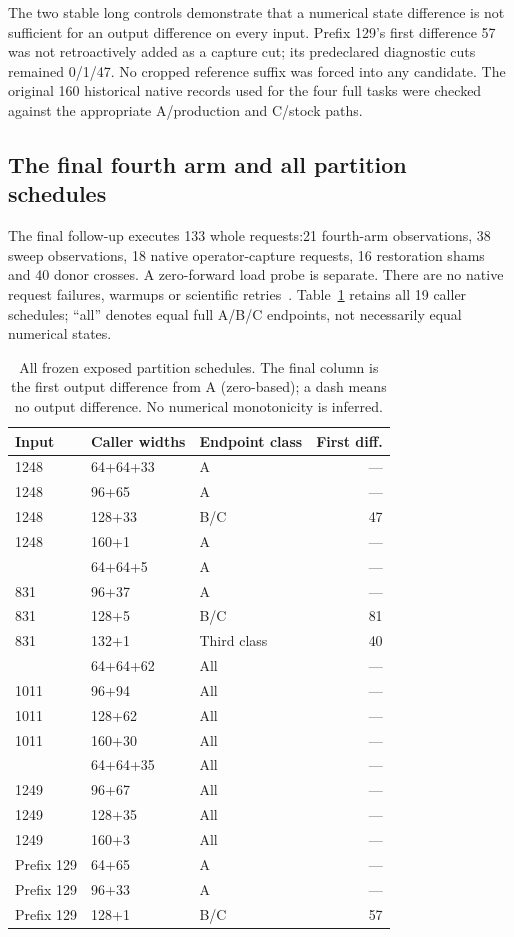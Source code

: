 The two stable long controls demonstrate that a numerical state difference is not sufficient for an output difference on every input. Prefix 129's first difference 57 was not retroactively added as a capture cut; its predeclared diagnostic cuts remained 0/1/47. No cropped reference suffix was forced into any candidate. The original 160 historical native records used for the four full tasks were checked against the appropriate A/production and C/stock paths.

\subsection{The final fourth arm and all partition schedules}
The final follow-up executes 133 whole requests:21 fourth-arm observations, 38 sweep observations, 18 native operator-capture requests, 16 restoration shams and 40 donor crosses. A zero-forward load probe is separate. There are no native request failures, warmups or scientific retries~\cite{bfinal}. Table~\ref{tab:allpart} retains all 19 caller schedules; ``all'' denotes equal full A/B/C endpoints, not necessarily equal numerical states.

\begin{table}[t]\centering\small
\caption{All frozen exposed partition schedules. The final column is the first output difference from A (zero-based); a dash means no output difference. No numerical monotonicity is inferred.}
\label{tab:allpart}
\begin{tabular}{@{}lllr@{}}\toprule
Input&Caller widths&Endpoint class&First diff.\\\midrule
1248&64+64+33&A&---\\
1248&96+65&A&---\\
1248&128+33&B/C&47\\
1248&160+1&A&---\\\addlinespace[2pt]
831&64+64+5&A&---\\
831&96+37&A&---\\
831&128+5&B/C&81\\
831&132+1&Third class&40\\\addlinespace[2pt]
1011&64+64+62&All&---\\
1011&96+94&All&---\\
1011&128+62&All&---\\
1011&160+30&All&---\\\addlinespace[2pt]
1249&64+64+35&All&---\\
1249&96+67&All&---\\
1249&128+35&All&---\\
1249&160+3&All&---\\\addlinespace[2pt]
Prefix 129&64+65&A&---\\
Prefix 129&96+33&A&---\\
Prefix 129&128+1&B/C&57\\\bottomrule
\end{tabular}
\end{table}

